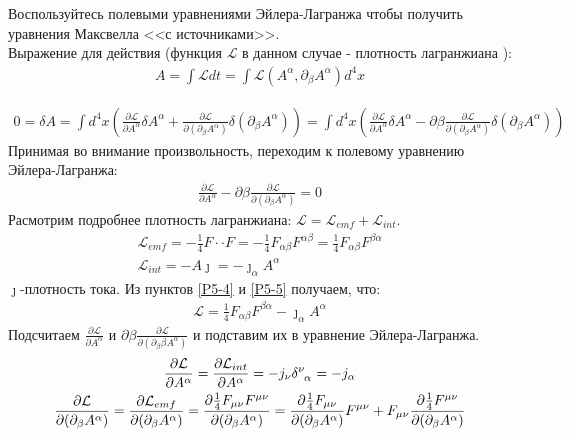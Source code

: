 \documentclass[__main__.tex]{subfiles}
\begin{document}
Воспользуйтесь полевыми уравнениями Эйлера-Лагранжа чтобы получить уравнения Максвелла <<с источниками>>.\\ 

	Выражение для действия (функция $\mathcal{L}$ в данном случае - плотность лагранжиана ): 
\begin{gather}
\label{P5-1}
A=\int \mathcal{L}dt=\int \mathcal{L}( A^{\alpha},\partial_\beta  A^{\alpha})d^4x
\end{gather}

\begin{gather}
\label{P5-2}
0=\delta A=
\int d^4x\left(
\frac{\partial \mathcal{L}}{\partial A^\alpha}\delta A^\alpha+\frac{\partial  \mathcal{L}}{\partial(\partial_\beta A^\alpha)}\delta(\partial_\beta A^\alpha)\right)=
\int d^4x(\frac{\partial \mathcal{L}}{\partial  A^\alpha}\delta A^\alpha-\partial\beta\frac{\partial  \mathcal{L}}{\partial(\partial_\beta A^\alpha)}\delta(\partial_\beta A^\alpha)) 
\end{gather}
Принимая во внимание произвольность, переходим к полевому уравнению Эйлера-Лагранжа: \\
\begin{gather}
\label{P5-3}
\frac{\partial \mathcal{L}}{\partial  A^\alpha}-\partial\beta\frac{\partial  \mathcal{L}}{\partial(\partial_\beta A^\alpha)}=0
\end{gather}
Расмотрим подробнее плотность лагранжиана: $ \mathcal{L} = \mathcal{L}_{emf}+ \mathcal{L}_{int}.$\\
\begin{gather}
\label{P5-4}
\mathcal{L}_{emf}=-\frac{1}{4}F\cdot\cdot F=-\frac{1}{4}F_{\alpha\beta}F^{\alpha\beta}=\frac{1}{4}F_{\alpha\beta}F^{\beta\alpha}\\
\label{P5-5}
\mathcal{L}_{int}=- A\jmath=-\jmath_\alpha A^\alpha
\end{gather}
$\jmath$-плотность тока. Из пунктов \ref{P5-4} и \ref{P5-5} получаем, что:
\begin{gather}
\label{P5-6}
\mathcal{L}=\frac{1}{4}F_{\alpha\beta}F^{\beta\alpha}-\jmath_\alpha A^\alpha
\end{gather}
Подсчитаем $\frac{\partial \mathcal{L}}{\partial  A^\alpha}$ и $\partial\beta\frac{\partial  \mathcal{L}}{\partial(\partial_\beta\beta A^\alpha)}$ и подставим их в уравнение Эйлера-Лагранжа.
\begin{gather}
\label{P5-7}
\frac{\partial \mathcal{L}}{\partial A^\alpha}=
\frac{\partial \mathcal{L}_{int}}{\partial  A^\alpha}=
-j_\nu\delta\indices{^\nu_\alpha} = -j_\alpha\\
\label{P5-8}
\frac{\partial  \mathcal{L}}{\partial(\partial_\beta A^\alpha)}=\frac{\partial  \mathcal{L}_{emf}}{\partial(\partial_\beta A^\alpha)}=
\frac{\partial\frac{1}{4}F_{\mu\nu}F^{\mu\nu}}{\partial(\partial_\beta A^\alpha)} =
\frac{\partial\frac{1}{4}F_{\mu\nu}}{\partial(\partial_\beta A^\alpha)}F^{\mu\nu}+F_{\mu\nu}\frac{\partial\frac{1}{4}F^{\mu\nu}}{\partial(\partial_\beta A^\alpha)}
\end{gather}
\end{document}
